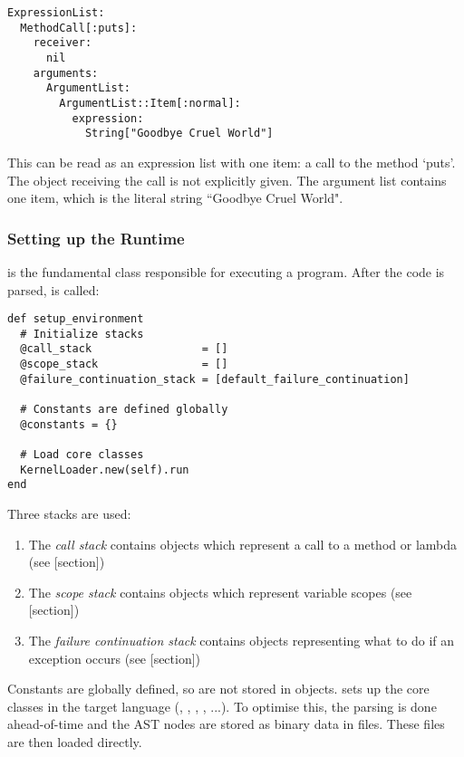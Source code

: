 \begin{verbatim}
ExpressionList:
  MethodCall[:puts]:
    receiver:
      nil
    arguments:
      ArgumentList:
        ArgumentList::Item[:normal]:
          expression:
            String["Goodbye Cruel World"]
\end{verbatim}

This can be read as an expression list with one item: a call to the method `puts'. The object receiving the call is not explicitly given. The argument list contains one item, which is the literal string ``Goodbye Cruel World".

\subsubsection{Setting up the Runtime}

 is the fundamental class responsible for executing a program. After the code is parsed,  is called:

\begin{lstlisting}
def setup_environment
  # Initialize stacks
  @call_stack                 = []
  @scope_stack                = []
  @failure_continuation_stack = [default_failure_continuation]
  
  # Constants are defined globally
  @constants = {}
  
  # Load core classes
  KernelLoader.new(self).run
end
\end{lstlisting}

Three stacks are used:

\begin{enumerate}
  \item The \textit{call stack} contains  objects which represent a call to a method or lambda (see [section])
  \item The \textit{scope stack} contains  objects which represent variable scopes (see [section])
  \item The \textit{failure continuation stack} contains objects representing what to do if an exception occurs (see [section])
\end{enumerate}

Constants are globally defined, so are not stored in  objects.  sets up the core classes in the target language (, , , , ...). To optimise this, the parsing is done ahead-of-time and the AST nodes are stored as binary data in files. These files are then loaded directly.

